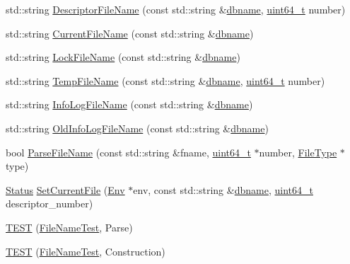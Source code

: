\begin{DoxyCompactItemize}
\item 
std\-::string \hyperlink{namespaceleveldb_a1ea160b70b18dc85b537e16db3d6ddd0}{Descriptor\-File\-Name} (const std\-::string \&\hyperlink{c__test_8c_a75d845559336df6843f3b599960f89d2}{dbname}, \hyperlink{stdint_8h_aaa5d1cd013383c889537491c3cfd9aad}{uint64\-\_\-t} number)
\item 
std\-::string \hyperlink{namespaceleveldb_affcb2d434f2a772d7c764cd5d1797a9a}{Current\-File\-Name} (const std\-::string \&\hyperlink{c__test_8c_a75d845559336df6843f3b599960f89d2}{dbname})
\item 
std\-::string \hyperlink{namespaceleveldb_a9f772d88ab2d47dec0d68e5eb85c579e}{Lock\-File\-Name} (const std\-::string \&\hyperlink{c__test_8c_a75d845559336df6843f3b599960f89d2}{dbname})
\item 
std\-::string \hyperlink{namespaceleveldb_a0563c700d6ff17e88f429464c1442da1}{Temp\-File\-Name} (const std\-::string \&\hyperlink{c__test_8c_a75d845559336df6843f3b599960f89d2}{dbname}, \hyperlink{stdint_8h_aaa5d1cd013383c889537491c3cfd9aad}{uint64\-\_\-t} number)
\item 
std\-::string \hyperlink{namespaceleveldb_ac40453ca7f9c0bd723873ffe32dc12a2}{Info\-Log\-File\-Name} (const std\-::string \&\hyperlink{c__test_8c_a75d845559336df6843f3b599960f89d2}{dbname})
\item 
std\-::string \hyperlink{namespaceleveldb_a2964797a29cbda9d37cce54109eefdc6}{Old\-Info\-Log\-File\-Name} (const std\-::string \&\hyperlink{c__test_8c_a75d845559336df6843f3b599960f89d2}{dbname})
\item 
bool \hyperlink{namespaceleveldb_af18fdbbcb483d40c35b4aaa4f00d3f6c}{Parse\-File\-Name} (const std\-::string \&fname, \hyperlink{stdint_8h_aaa5d1cd013383c889537491c3cfd9aad}{uint64\-\_\-t} $\ast$number, \hyperlink{namespaceleveldb_ab8e559ac5cadcb2b5dd531c60df944f1}{File\-Type} $\ast$type)
\item 
\hyperlink{classleveldb_1_1_status}{Status} \hyperlink{namespaceleveldb_a73133aa2e18928553d14913491b094e7}{Set\-Current\-File} (\hyperlink{classleveldb_1_1_env}{Env} $\ast$env, const std\-::string \&\hyperlink{c__test_8c_a75d845559336df6843f3b599960f89d2}{dbname}, \hyperlink{stdint_8h_aaa5d1cd013383c889537491c3cfd9aad}{uint64\-\_\-t} descriptor\-\_\-number)
\item 
\hyperlink{namespaceleveldb_a28c411f7a30e2e869123a26f6e69e733}{T\-E\-S\-T} (\hyperlink{classleveldb_1_1_file_name_test}{File\-Name\-Test}, Parse)
\item 
\hyperlink{namespaceleveldb_ac77b62bf86349926d23431e4c1c9034a}{T\-E\-S\-T} (\hyperlink{classleveldb_1_1_file_name_test}{File\-Name\-Test}, Construction)

\end{DoxyCompactItemize}
